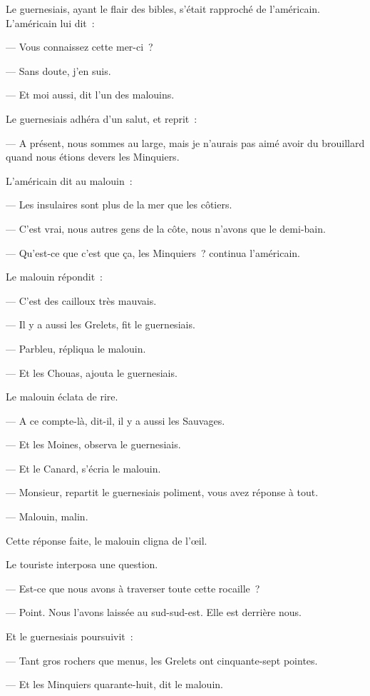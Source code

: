 \documentclass[french,twoside]{book} %
\begin{document}
Le guernesiais, ayant le flair des bibles, s’était rapproché de l’américain. L’américain lui dit :\par
— Vous connaissez cette mer-ci ?\par
— Sans doute, j’en suis.\par
— Et moi aussi, dit l’un des malouins.\par
Le guernesiais adhéra d’un salut, et reprit :\par
— A présent, nous sommes au large, mais je  n’aurais pas aimé avoir du brouillard quand nous étions devers les Minquiers.\par
L’américain dit au malouin :\par
— Les insulaires sont plus de la mer que les côtiers.\par
— C’est vrai, nous autres gens de la côte, nous n’avons que le demi-bain.\par
— Qu’est-ce que c’est que ça, les Minquiers ? continua l’américain.\par
Le malouin répondit :\par
— C’est des cailloux très mauvais.\par
— Il y a aussi les Grelets, fit le guernesiais.\par
— Parbleu, répliqua le malouin.\par
— Et les Chouas, ajouta le guernesiais.\par
Le malouin éclata de rire.\par
— A ce compte-là, dit-il, il y a aussi les Sauvages.\par
— Et les Moines, observa le guernesiais.\par
— Et le Canard, s’écria le malouin.\par
— Monsieur, repartit le guernesiais poliment, vous avez réponse à tout.\par
— Malouin, malin.\par
Cette réponse faite, le malouin cligna de l’œil.\par
Le touriste interposa une question.\par
— Est-ce que nous avons à traverser toute cette rocaille ?\par
— Point. Nous l’avons laissée au sud-sud-est. Elle est derrière nous.\par
Et le guernesiais poursuivit :\par
— Tant gros rochers que menus, les Grelets ont cinquante-sept pointes.\par
— Et les Minquiers quarante-huit, dit le malouin.\par
\end{document}
